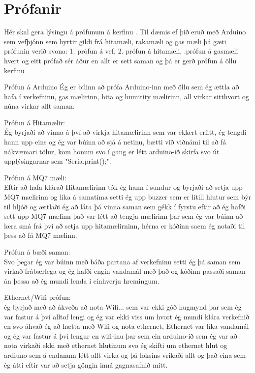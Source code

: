 \section{Prófanir}
Hér skal gera lýsingu á prófunum á kerfinu . Til dæmis ef þið eruð með Arduino sem vefþjónn sem byrtir gildi frá hitamæli, rakamæli og gas mæli þá gæti prófunin verið svona: 1. prófun á vef, 2. prófun á hitamæli, .prófun á gasmæli hvert og eitt prófað sér áður en allt er sett saman og þá er gerð prófun á öllu kerfinu

Prófun á Arduino
Ég er búinn að prófa Arduino-inn með öllu sem ég ættla að hafa í verkefninu, gas mælirinn, hita og humitity mælirinn, all virkar sitthvort og núna virkar allt saman.

Prófun á Hitamælir: \\
Ég byrjaði að vinna á því að virkja hitamælirinn sem var ekkert erfitt, ég tengdi hann upp eins og ég var búinn að sjá á netinu, bætti við viðnámi til að fá nákvæmari tölur, kom honum svo í gang er létt arduino-ið skirfa svo út upplýsingarnar sem "Seria.print();".
\begingroup

\endgroup
Prófun á MQ7 mæli: \\
Eftir að hafa klárað Hitamælirinn tók ég hann í sundur og byrjaði að setja upp MQ7 mælirinn og líka á samatíma setti ég upp buzzer sem er lítill hlutur sem býr til hljóð og ættlaði ég að láta þá vinna saman sem gékk í fyrstu eftir að ég hafði sett upp MQ7 mælinn það var létt að tengja mælirinn þar sem ég var búinn að læra smá frá því að setja upp hitamælirninn, hérna er kóðinn saem ég notaði til þess að fá MQ7 mælinn.
\begingroup

\endgroup

Prófun á bæði saman: \\
Svo þegar ég var búinn með báða partana af verkefninu setti ég þá saman sem virkað frábærlega og ég hafði engin vandamál með það og kóðinn passaði saman án þessa að ég mundi lenda í einhverju hremingum.

Ethernet/Wifi prófun: \\
ég byrjað með að ákveða að nota Wifi... sem var ekki góð hugmynd þar sem ég var fastur á því alltof lengi og ég var ekki viss um hvort ég mundi klára verkefnið en svo áhvað ég að hætta með Wifi og nota ethernet, Ethernet var líka vandamál og ég var fastur á því lengur en wifi-inu þar sem ein arduino-ið sem ég var að nota virkaði ekki með ethernet hlutinum svo ég skifti um ethernet hlut og ardiuno sem á endanum létt allt virka og þá loksins vrikaði allt og það eina sem ég átti eftir var að setja göngin inná gagnasafnið mitt.